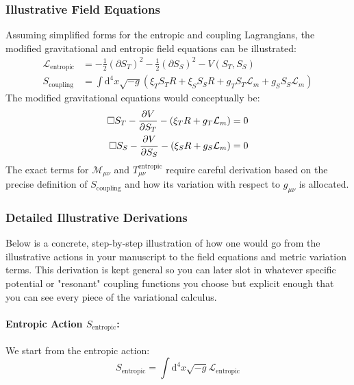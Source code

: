 \documentclass[11pt,a4paper]{article}
\newcommand{\Mmu}{\mathcal{M}}
\newcommand{\ST}{S_T}
\newcommand{\SSp}{S_S}
\newcommand{\Scoupling}{S_{\text{coupling}}}
\newcommand{\Sentropic}{S_{\text{entropic}}}
\newcommand{\Lm}{\mathcal{L}_m}
\newcommand{\Tmnentropic}{T^{\text{entropic}}_{\mu\nu}}
\begin{document}
\subsubsection{Illustrative Field Equations}
Assuming simplified forms for the entropic and coupling Lagrangians, the modified gravitational and entropic field equations can be illustrated:
\begin{align*}
\mathcal{L}_{\text{entropic}}&=-\frac{1}{2}(\partial\ST)^2-\frac{1}{2}(\partial\SSp)^2-V(\ST,\SSp)\\
\Scoupling&=\int\text{d}^4x\sqrt{-g}(\xi_T\ST R+\xi_S\SSp R+g_T\ST\Lm+g_S\SSp\Lm)
\end{align*}
The modified gravitational equations would conceptually be:
\begin{align*}
\Box\ST-\pdv{V}{\ST}-(\xi_T R+g_T\Lm)&=0\\
\Box\SSp-\pdv{V}{\SSp}-(\xi_S R+g_S\Lm)&=0
\end{align*}
The exact terms for $\Mmu_{\mu\nu}$ and $\Tmnentropic$ require careful derivation based on the precise definition of $\Scoupling$ and how its variation with respect to $g_{\mu\nu}$ is allocated.

\subsubsection{Detailed Illustrative Derivations}
Below is a concrete, step-by-step illustration of how one would go from the illustrative actions in your manuscript to the field equations and metric variation terms. This derivation is kept general so you can later slot in whatever specific potential or "resonant" coupling functions you choose but explicit enough that you can see every piece of the variational calculus.

\paragraph{Entropic Action $\Sentropic$:}
We start from the entropic action:
\begin{equation*}
\Sentropic=\int\text{d}^4x\sqrt{-g}\mathcal{L}_{\text{entropic}}
\end{equation*}
\end{document}
